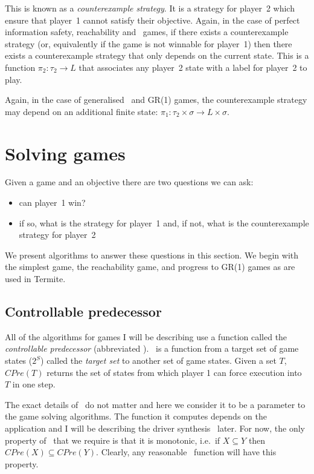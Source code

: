 This is known as a \emph{counterexample strategy}. It is a strategy for player~2 which ensure that player~1 cannot satisfy their objective. Again, in the case of perfect information safety, reachability and \buchi\ games, if there exists a counterexample strategy (or, equivalently if the game is not winnable for player~1) then there exists a counterexample strategy that only depends on the current state. This is a function $\pi_2 : \tau_2 \rightarrow L$ that associates any player~2 state with a label for player~2 to play. 

Again, in the case of generalised \buchi\ and GR(1) games, the counterexample strategy may depend on an additional finite state: $\pi_1 : \tau_2 \times \sigma \rightarrow L \times \sigma$.

\section{Solving games}

Given a game and an objective there are two questions we can ask:
\begin{itemize}
    \item can player~1 win?
    \item if so, what is the strategy for player~1 and, if not, what is the counterexample strategy for player~2
\end{itemize}

We present algorithms to answer these questions in this section. We begin with the simplest game, the reachability game, and progress to GR(1) games as are used in Termite.

\subsection{Controllable predecessor}

All of the algorithms for games I will be describing use a function called the \emph{controllable predecessor} (abbreviated \cpre). \cpre\ is a function from a target set of game states ($2^S$) called the \emph{target set} to another set of game states. Given a set $T$, $CPre(T)$ returns the set of states from which player 1 can force execution into $T$ in one step. 

The exact details of \cpre\ do not matter and here we consider it to be a parameter to the game solving algorithms. The function it computes depends on the application and I will be describing the driver synthesis \cpre\ later. For now, the only property of \cpre\ that we require is that it is monotonic, i.e.\ if $X \subseteq Y$ then $CPre(X) \subseteq CPre(Y)$. Clearly, any reasonable \cpre\ function will have this property.

